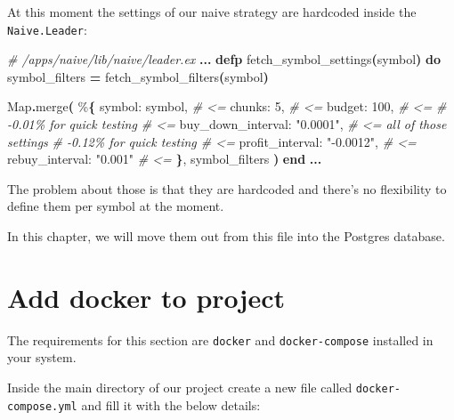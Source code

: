 \documentclass[
  oneside]{book}
\newenvironment{Shaded}{\begin{snugshade}}{\end{snugshade}}
\newcommand{\CommentTok}[1]{\textcolor[rgb]{0.56,0.35,0.01}{\textit{#1}}}
\newcommand{\ConstantTok}[1]{\textcolor[rgb]{0.56,0.35,0.01}{#1}}
\newcommand{\DecValTok}[1]{\textcolor[rgb]{0.00,0.00,0.81}{#1}}
\newcommand{\FunctionTok}[1]{\textcolor[rgb]{0.13,0.29,0.53}{\textbf{#1}}}
\newcommand{\KeywordTok}[1]{\textcolor[rgb]{0.13,0.29,0.53}{\textbf{#1}}}
\newcommand{\NormalTok}[1]{#1}
\newcommand{\OperatorTok}[1]{\textcolor[rgb]{0.81,0.36,0.00}{\textbf{#1}}}
\newcommand{\StringTok}[1]{\textcolor[rgb]{0.31,0.60,0.02}{#1}}
\newcommand{\VariableTok}[1]{\textcolor[rgb]{0.00,0.00,0.00}{#1}}
\begin{document}
At this moment the settings of our naive strategy are hardcoded inside the \texttt{Naive.Leader}:

\begin{Shaded}
\begin{Highlighting}[]
  \CommentTok{\# /apps/naive/lib/naive/leader.ex}
  \OperatorTok{...}
  \KeywordTok{defp}\NormalTok{ fetch\_symbol\_settings}\FunctionTok{(}\NormalTok{symbol}\FunctionTok{)} \KeywordTok{do}
\NormalTok{    symbol\_filters }\OperatorTok{=}\NormalTok{ fetch\_symbol\_filters}\FunctionTok{(}\NormalTok{symbol}\FunctionTok{)}

    \ConstantTok{Map}\OperatorTok{.}\NormalTok{merge}\FunctionTok{(}
\NormalTok{      \%}\FunctionTok{\{}
        \VariableTok{symbol:}\NormalTok{ symbol,              }\CommentTok{\# \textless{}=}
        \VariableTok{chunks:} \DecValTok{5}\NormalTok{,                   }\CommentTok{\# \textless{}=}
        \VariableTok{budget:} \DecValTok{100}\NormalTok{,                 }\CommentTok{\# \textless{}=}
        \CommentTok{\# {-}0.01\% for quick testing   \# \textless{}=}
        \VariableTok{buy\_down\_interval:} \StringTok{"0.0001"}\NormalTok{, }\CommentTok{\# \textless{}= all of those settings}
        \CommentTok{\# {-}0.12\% for quick testing   \# \textless{}=}
        \VariableTok{profit\_interval:} \StringTok{"{-}0.0012"}\NormalTok{,  }\CommentTok{\# \textless{}=}
        \VariableTok{rebuy\_interval:} \StringTok{"0.001"}      \CommentTok{\# \textless{}=}
      \FunctionTok{\}}\NormalTok{,}
\NormalTok{      symbol\_filters}
    \FunctionTok{)}
  \KeywordTok{end}
  \OperatorTok{...}
\end{Highlighting}
\end{Shaded}

The problem about those is that they are hardcoded and there's no flexibility to define them per symbol at the moment.

In this chapter, we will move them out from this file into the Postgres database.

\section{Add docker to project}\label{add-docker-to-project}

The requirements for this section are \texttt{docker} and \texttt{docker-compose} installed in your system.

Inside the main directory of our project create a new file called \texttt{docker-compose.yml} and fill it with the below details:
\end{document}
